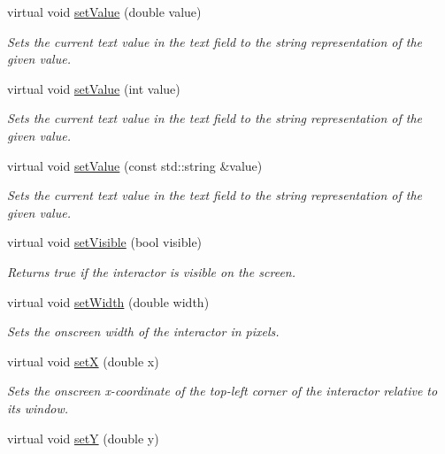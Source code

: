 \begin{DoxyCompactItemize}
virtual void \mbox{\hyperlink{classsgl_1_1GTextField_a1a31743bc7def7cf7fdad044c84d9268}{set\+Value}} (double value)
\begin{DoxyCompactList}\small\item\em Sets the current text value in the text field to the string representation of the given value. \end{DoxyCompactList}\item 
virtual void \mbox{\hyperlink{classsgl_1_1GTextField_a23d79e21b8ed72e19278ca31d47b8c87}{set\+Value}} (int value)
\begin{DoxyCompactList}\small\item\em Sets the current text value in the text field to the string representation of the given value. \end{DoxyCompactList}\item 
virtual void \mbox{\hyperlink{classsgl_1_1GTextField_ab18c7a418be64c4f909beebc277a1321}{set\+Value}} (const std\+::string \&value)
\begin{DoxyCompactList}\small\item\em Sets the current text value in the text field to the string representation of the given value. \end{DoxyCompactList}\item 
virtual void \mbox{\hyperlink{classsgl_1_1GInteractor_a18e44e30b31525a243960ca3928125aa}{set\+Visible}} (bool visible)
\begin{DoxyCompactList}\small\item\em Returns true if the interactor is visible on the screen. \end{DoxyCompactList}\item 
virtual void \mbox{\hyperlink{classsgl_1_1GInteractor_aa3f3fba4cb131baa8696ba01e3bceca1}{set\+Width}} (double width)
\begin{DoxyCompactList}\small\item\em Sets the onscreen width of the interactor in pixels. \end{DoxyCompactList}\item 
virtual void \mbox{\hyperlink{classsgl_1_1GInteractor_a9c18fcc579333bf9653d13ad2b372e39}{setX}} (double x)
\begin{DoxyCompactList}\small\item\em Sets the onscreen x-\/coordinate of the top-\/left corner of the interactor relative to its window. \end{DoxyCompactList}\item 
virtual void \mbox{\hyperlink{classsgl_1_1GInteractor_a7d57e2a5c35d27feb58fd498a3cf82b9}{setY}} (double y)

\end{DoxyCompactItemize}
